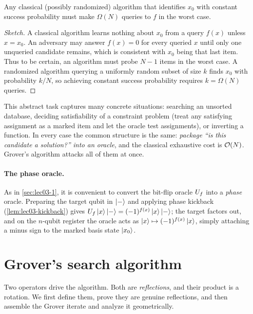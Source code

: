 \begin{proposition}
\label{prop:lec03-classical}
Any classical (possibly randomized) algorithm that identifies $x_0$ with constant
success probability must make $\Omega(N)$ queries to $f$ in the worst case.
\end{proposition}

\begin{proof}[Sketch]
A classical algorithm learns nothing about $x_0$ from a query $f(x)$ unless
$x=x_0$. An adversary may answer $f(x)=0$ for every queried $x$ until only one
unqueried candidate remains, which is consistent with $x_0$ being that last item.
Thus to be certain, an algorithm must probe $N-1$ items in the worst case. A
randomized algorithm querying a uniformly random subset of size $k$ finds $x_0$
with probability $k/N$, so achieving constant success probability requires
$k=\Omega(N)$ queries.
\end{proof}

This abstract task captures many concrete situations: searching an unsorted
database, deciding satisfiability of a constraint problem (treat any satisfying
assignment as a marked item and let the oracle test assignments), or inverting a
function. In every case the common structure is the same: \emph{package ``is this
candidate a solution?'' into an oracle}, and the classical exhaustive cost is
$\mathcal{O}(N)$. Grover's algorithm attacks all of them at once.

\paragraph{The phase oracle.}
As in \cref{sec:lec03-1}, it is convenient to convert the bit-flip oracle $U_{f}$
into a \emph{phase} oracle. Preparing the target qubit in $\ket{-}$ and applying
phase kickback (\cref{lem:lec03-kickback}) gives
$U_{f}\ket{x}\ket{-}=(-1)^{f(x)}\ket{x}\ket{-}$; the target factors out, and on the
$n$-qubit register the oracle acts as $\ket{x}\mapsto(-1)^{f(x)}\ket{x}$, simply
attaching a minus sign to the marked basis state $\ket{x_0}$.

\section{Grover's search algorithm}
\label{sec:lec03-3}

Two operators drive the algorithm. Both are \emph{reflections}, and their product
is a rotation. We first define them, prove they are genuine reflections, and then
assemble the Grover iterate and analyze it geometrically.

